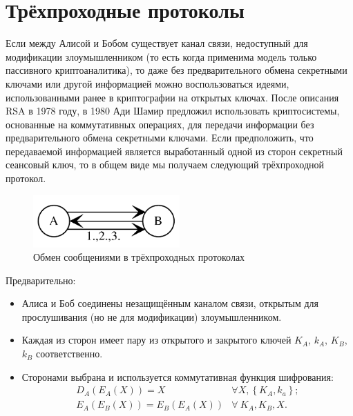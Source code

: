\section{Трёхпроходные протоколы}\label{section-three-pass-protocols}

Если между Алисой и Бобом существует канал связи, недоступный для модификации злоумышленником (то есть когда применима модель только пассивного криптоаналитика), то даже без предварительного обмена секретными ключами или другой информацией можно воспользоваться идеями, использованными ранее в криптографии на открытых ключах. После описания RSA в 1978 году, в 1980 Ади Шамир предложил использовать криптосистемы, основанные на коммутативных операциях, для передачи информации без предварительного обмена секретными ключами. Если предположить, что передаваемой информацией является выработанный одной из сторон секретный сеансовый ключ, то в общем виде мы получаем следующий трёхпроходной протокол.

\begin{figure}[!hb]
    \centering
    \includegraphics[width=0.5\textwidth]{pic/key_distribution-three-pass}
    \caption{Обмен сообщениями в трёхпроходных протоколах\label{fig:key_distribution-three-pass}}
\end{figure}

Предварительно:

\begin{itemize}
	\item Алиса и Боб соединены незащищённым каналом связи, открытым для прослушивания (но не для модификации) злоумышленником.
	\item Каждая из сторон имеет пару из открытого и закрытого ключей $K_A$, $k_A$, $K_B$, $k_B$ соответственно.
	\item Сторонами выбрана и используется коммутативная функция шифрования:
	\[\begin{array}{lll}
		D_{A} \left( E_{A} \left( X \right) \right)	= X                                       & \forall X, \left\{ K_A, k_a \right\}; \\
		E_{A} \left( E_{B} \left( X \right) \right)	= E_B \left( E_A \left( X \right) \right) & \forall ~ K_A, K_B, X.
	\end{array}\]
\end{itemize}

